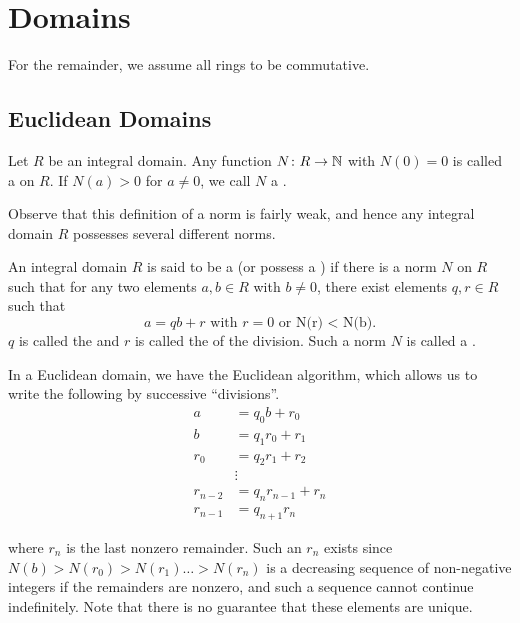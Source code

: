 \section{Domains}

For the remainder, we assume all rings to be commutative.

\subsection{Euclidean Domains}

\begin{defn}
    Let $R$ be an integral domain. Any function $N \colon R \to \mathbb{N}$ with $N(0) = 0$ is called a  on $R$. If $N(a) > 0$ for $a \neq 0$, we call $N$ a .
\end{defn}

Observe that this definition of a norm is fairly weak, and hence any integral domain $R$ possesses several different norms. 

\begin{defn}
    An integral domain $R$ is said to be a  (or possess a ) if there is a norm $N$ on $R$ such that for any two elements $a,b \in R$ with $b \neq 0$, there exist elements $q,r \in R$ such that
    \[
        a = qb + r \text{ with $r=0$ or N(r) < N(b).}
    \]
    $q$ is called the  and $r$ is called the  of the division. Such a norm $N$ is called a .
\end{defn}

In a Euclidean domain, we have the Euclidean algorithm, which allows us to write the following by successive ``divisions''.
\begin{align*}
    a &= q_0 b + r_0 \\
    b &= q_1 r_0 + r_1 \\
    r_0 &= q_2 r_1 + r_2 \\
    &\vdots \\
    r_{n-2} &= q_n r_{n-1} + r_n \\
    r_{n-1} &= q_{n+1} r_n
\end{align*}

where $r_n$ is the last nonzero remainder. Such an $r_n$ exists since $N(b) > N(r_0) > N(r_1) \ldots > N(r_n)$ is a decreasing sequence of non-negative integers if the remainders are nonzero, and such a sequence cannot continue indefinitely. Note that there is no guarantee that these elements are unique.

